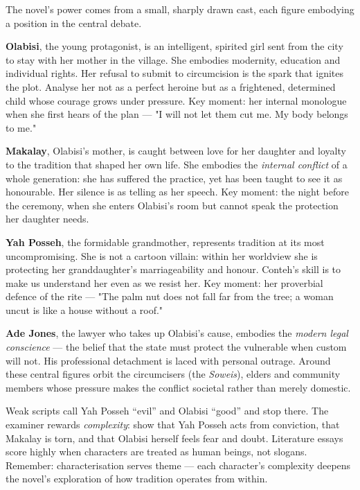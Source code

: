 \documentclass[11pt]{article}
\newcommand{\cle}[1]{{\popxbold\color{popdark}#1}}
\newcounter{popsec}
\newcounter{popsub}
\newcommand{\courssub}[1]{%
  \stepcounter{popsub}%
  \par\vspace{9pt}\noindent{\popxbold\fontsize{11.5}{13}\selectfont\color{popink}{\color{poporange}\thepopsec.\thepopsub}\hspace{6pt}#1}\par\nopagebreak\vspace{4pt}
}
\begin{document}
\courssub{Character Introduction and Analysis}

The novel's power comes from a small, sharply drawn cast, each figure embodying a position in the central debate.

\textbf{Olabisi}, the young protagonist, is an intelligent, spirited girl sent from the city to stay with her mother in the village. She embodies \cle{modernity, education and individual rights}. Her refusal to submit to circumcision is the spark that ignites the plot. Analyse her not as a perfect heroine but as a frightened, determined child whose courage grows under pressure. Key moment: her internal monologue when she first hears of the plan --- "I will not let them cut me. My body belongs to me."

\textbf{Makalay}, Olabisi's mother, is caught between love for her daughter and loyalty to the tradition that shaped her own life. She embodies the \emph{internal conflict} of a whole generation: she has suffered the practice, yet has been taught to see it as honourable. Her silence is as telling as her speech. Key moment: the night before the ceremony, when she enters Olabisi's room but cannot speak the protection her daughter needs.

\textbf{Yah Posseh}, the formidable grandmother, represents \cle{tradition at its most uncompromising}. She is not a cartoon villain: within her worldview she is protecting her granddaughter's marriageability and honour. Conteh's skill is to make us understand her even as we resist her. Key moment: her proverbial defence of the rite --- "The palm nut does not fall far from the tree; a woman uncut is like a house without a roof."

\textbf{Ade Jones}, the lawyer who takes up Olabisi's cause, embodies the \emph{modern legal conscience} --- the belief that the state must protect the vulnerable when custom will not. His professional detachment is laced with personal outrage. Around these central figures orbit the circumcisers (the \emph{Soweis}), elders and community members whose pressure makes the conflict societal rather than merely domestic.

\begin{attention}
Weak scripts call Yah Posseh ``evil'' and Olabisi ``good'' and stop there. The examiner rewards \emph{complexity}: show that Yah Posseh acts from conviction, that Makalay is torn, and that Olabisi herself feels fear and doubt. Literature essays score highly when characters are treated as human beings, not slogans. Remember: \cle{characterisation serves theme} --- each character's complexity deepens the novel's exploration of how tradition operates from within.
\end{attention}
\end{document}
